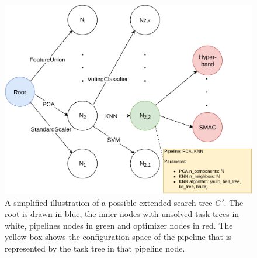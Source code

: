\begin{figure}[ht!]
    \centering
    \includegraphics[width=\textwidth]{gfx/Figures/Approach/SearchGraph.pdf}
    \caption[A simplified illustration of a possible extended search tree $G'$.]{A simplified illustration of a possible extended search tree $G'$. The root is drawn in blue, the inner nodes with unsolved task-trees in white, pipelines nodes in green and optimizer nodes in red.
    The yellow box shows the configuration space of the pipeline that is represented by the task tree in that pipeline node.}
    \label{fig:appraoch:search-graph}
\end{figure}

